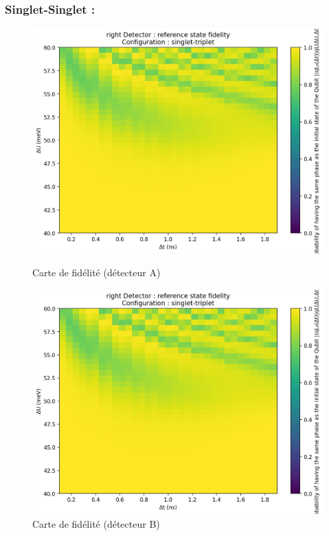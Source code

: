 \documentclass{article}
\begin{document}
\subsubsection{Singlet-Singlet :}

\begin{figure}[H]
  \centering
  \begin{minipage}[c]{0.48\textwidth}
    \centering
    \includegraphics[width=\textwidth]{p_detector_overlap_map_33x33_20250822-003725_faible.png}
    \caption{Carte de fidélité (détecteur A)}
    \label{fig:fidelity_map_a}
  \end{minipage}\hfill
  \begin{minipage}[c]{0.48\textwidth}
    \centering
    \includegraphics[width=\textwidth]{p_detector_overlap_map_33x33_20250822-003725_faible.png}
    \caption{Carte de fidélité (détecteur B)}
    \label{fig:fidelity_map_b}
  \end{minipage}
\end{figure}
\end{document}
